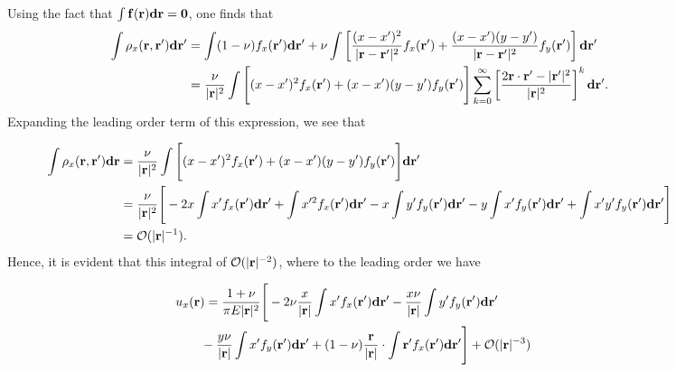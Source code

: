 \documentclass[aps,prl,reprint,twocolumn,groupedaddress,showpacs]{revtex4}
\def\d{{\bf d}}
\def\f{{\bf f}}
\def\r{{\bf r}}
\begin{document}
\begin{figure}
\begin{widetext}
Using the fact that $\int \f(\r)\d\r = \mathbf{0}$, one finds that
%
\begin{align}
\int \rho_{x}(\r,\r')\d\r'  & =  \int (1-\nu)f_x(\r')\d\r'
+\nu\int\left[\frac{(x - x')^2}{|\r-\r'|^2} f_{x}(\r') +
\frac{(x-x')(y-y')}{|\r-\r'|^2} f_y(\r')  \right]\d\r' \nonumber\\
\: &= \frac{\nu}{|\r|^2}\int\Bigg[(x - x')^2f_{x}(\r')
+ (x-x')(y-y')f_y(\r')  \Bigg]
\sum_{k=0}^\infty \left[\frac{2\r\cdot\r' - |\r'|^2}{|\r|^2} \right]^k \d\r'.
\end{align}
%
Expanding the leading order term of this expression, we see that

\begin{align*}
\int\rho_{x}(\r,\r')\d\r 
&= \frac{\nu}{|\r|^2}\int\Bigg[(x- x')^2f_{x}(\r')+(x-x')(y-y')f_y(\r')\Bigg]
\d\r' \nonumber\\
\: &= \frac{\nu}{|\r|^2}  \Bigg[  -2x\int x' f_x(\r')\d\r'  + \int x'^2 f_x(\r')\d\r'- x\int y' f_y(\r') \d\r'
- y\int x' f_y(\r')\d\r'
+ \int x'y' f_y(\r') \d\r'\Bigg] \nonumber \\
\: & =\mathcal{O}(|\r|^{-1}).
\end{align*}
%
Hence, it is evident that this integral of $\mathcal{O}(|\r|^{-2})$,
where to the leading order we have

\begin{align}
\lefteqn{u_x(\r) = \frac{1+\nu}{\pi E |\r|^2}
\Bigg[ -2\nu\frac{x}{|\r|}\int x' f_x(\r')\d\r'
-\frac{x\nu}{|\r|}\int y' f_y(\r') \d\r'  }\nonumber\\
&\qquad- \frac{y\nu}{|\r|}\int x' f_y(\r')\d\r' 
+ (1-\nu)\frac{\r}{|\r|}\cdot\int \r' f_x(\r') \d\r'\Bigg] + \mathcal{O}(|\r|^{-3})
\end{align}




\end{widetext}
\end{figure}
\end{document}
